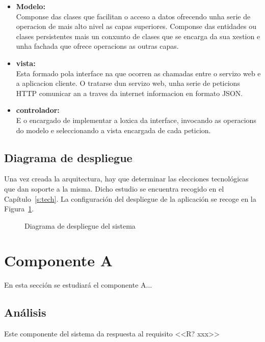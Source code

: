 \begin{itemize}
\item \textbf{Modelo:}\\
Componse das clases que facilitan o acceso a datos ofrecendo unha serie de operacion
de mais alto nivel as capas superiores. Componse das entidades ou clases persistentes
mais un conxunto de clases que se encarga da sua xestion e unha fachada que ofrece
operacions as outras capas.
\item \textbf{vista:}\\
Esta formado pola interface na que ocorren as chamadas entre o servizo web e a
aplicacion cliente. O tratarse dun servizo web, unha serie de peticions HTTP comunicar
an a traves da internet informacion en formato JSON.

\item \textbf{controlador:}\\
E
o encargado de implementar a loxica da interface, invocando as operacions do
modelo e seleccionando a vista encargada de cada peticion.



\end{itemize}




\subsection{Diagrama de despliegue}
Una vez creada la arquitectura, hay que determinar las elecciones tecnológicas que dan soporte a la misma. Dicho estudio se encuentra recogido en el Capítulo~\ref{s:tech}. La configuración del despliegue de la aplicación se recoge en la Figura~\ref{f:dev:arch-deploy}.

\begin{figure}[h!]
\centering
\caption{Diagrama de despliegue del sistema}
\label{f:dev:arch-deploy}
\end{figure}


\section{Componente A}
En esta sección se estudiará el componente A...

\subsection{Análisis}
Este componente del sistema da respuesta al requisito <<R? xxx>> 

